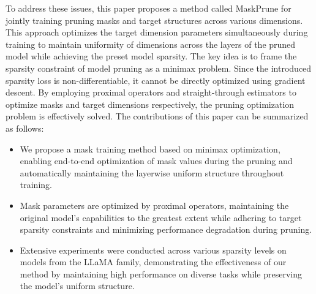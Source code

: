To address these issues, this paper proposes a method called MaskPrune for jointly training pruning masks and target structures across various dimensions. This approach optimizes the target dimension parameters simultaneously during training to maintain uniformity of dimensions across the layers of the pruned model while achieving the preset model sparsity. The key idea is to frame the sparsity constraint of model pruning as a minimax problem. Since the introduced sparsity loss is non-differentiable, it cannot be directly optimized using gradient descent. By employing proximal operators and straight-through estimators to optimize masks and target dimensions respectively, the pruning optimization problem is effectively solved. The contributions of this paper can be summarized as follows:



\begin{itemize} 
    \item We propose a mask training method based on minimax optimization, enabling end-to-end optimization of mask values during the pruning and automatically maintaining the layerwise uniform structure throughout training. 
    \item Mask parameters are optimized by proximal operators, maintaining the original model's capabilities to the greatest extent while adhering to target sparsity constraints and minimizing performance degradation during pruning.
    \item Extensive experiments were conducted across various sparsity levels on models from the LLaMA family, demonstrating the effectiveness of our method by maintaining high performance on diverse tasks while preserving the model's uniform structure.
\end{itemize}
